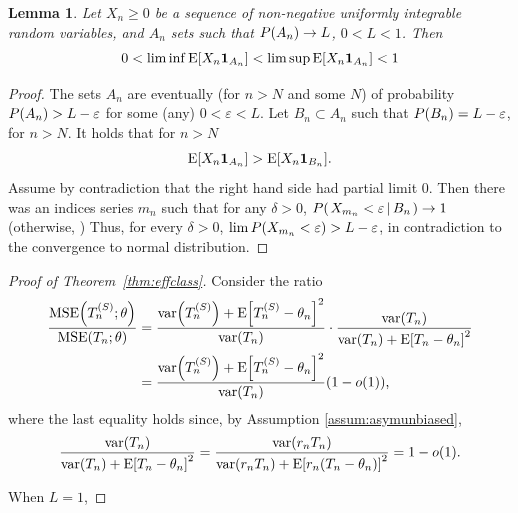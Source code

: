 \documentclass[ejs, twoside]{imsart}
\theoremstyle{plain}
\newtheorem{lemma}[theorem]{Lemma}
\theoremstyle{remark}
\newcommand{\fullstop}{\text{.}}
\newcommand{\comma}{\text{,}}
\newcommand{\MSE}{\operatorname{MSE}}
\newcommand{\cond}[2]{\left.{#1}\,\middle|\,{#2}\right.}
\numberwithin{equation}{section}
\numberwithin{table}{section}
\numberwithin{figure}{section}
\let\originalleft\left
\let\originalright\right
\renewcommand{\left}{\mathopen{}\mathclose\bgroup\originalleft}
\renewcommand{\right}{\aftergroup\egroup\originalright}
\begin{document}
\begin{appendix}
	\begin{lemma}
	Let \(X_n \geq 0\) be a sequence of non-negative uniformly integrable random variables, and \(A_n\) sets such that \(P\left(A_n \right) \to L \), \(0<L<1\). Then \[0 < \liminf \mean{X_n \indc*{A_n}} <
	\limsup \mean{X_n \indc*{A_n}} < 1\]
\end{lemma}

\begin{proof}
	The sets \(A_n\) are eventually (for \(n>N\) and some \(N\)) of probability \(P\left(A_n \right) > L - \varepsilon \) for some (any) \(0 < \varepsilon < L\). Let \(B_n \subset A_n\) such that \(P\left(B_n \right) = L - \varepsilon \), for \(n>N\). It holds that for \(n > N\)
	\begin{align}
		\mean{X_n \indc*{A_n}} > \mean{X_n \indc*{B_n}} %
		\fullstop
	\end{align}
	Assume by contradiction that the right hand side had partial limit \(0\). Then there was an indices series \(m_n\) such that for any \(\delta > 0\),
	\(P\left(\cond{
		X_{m_n} < \varepsilon}{B_n} \right) \to 1 \)
	(otherwise, )
	Thus, for every \(\delta > 0\), \(\lim P\left(X_{m_n} < \varepsilon \right) > L -\varepsilon  \), in contradiction to the convergence to normal distribution.
\end{proof}


	\begin{proof}[Proof of Theorem~\ref{thm:effclass}]
	Consider the ratio
	\begin{align*}
		\frac{\MSE\left(\estimfil; \theta\right) }{\MSE\left(\estimreg; \theta\right)} &=
		\frac{\var{\estimfil} + \mean{\estimfil - \theta_n }^2 }{\var{\estimreg}} \cdot \frac{\var{\estimreg}}{\var{\estimreg} + \mean{\estimreg - \theta_n }^2} \\&= \frac{\var{\estimfil} + \mean{\estimfil - \theta_n }^2 }{\var{\estimreg}}(1-o(1)) \comma
	\end{align*}
	where the last equality holds since, by Assumption \ref{assum:asymunbiased}, \[\frac{\var{\estimreg}}{\var{\estimreg} + \mean{\estimreg - \theta_n }^2} = \frac{\var{r_n\estimreg}}{\var{r_n\estimreg} + \mean{r_n\left( \estimreg - \theta_n \right) }^2} = 1 - o(1) \fullstop\]
	
	When \(L = 1\),
	

\end{proof}
\end{appendix}
\end{document}
